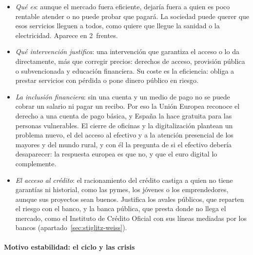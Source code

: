\documentclass[11pt]{article}
\begin{document}
\begin{itemize}
\item \emph{Qué es}: aunque el mercado fuera eficiente, dejaría fuera a quien es poco rentable atender o no puede probar que pagará. La sociedad puede querer que esos servicios lleguen a todos, como quiere que llegue la sanidad o la electricidad. Aparece en 2~frentes.
\item \emph{Qué intervención justifica}: una intervención que garantiza el acceso o lo da directamente, más que corregir precios: derechos de acceso, provisión pública o subvencionada y educación financiera. Su coste es la eficiencia: obliga a prestar servicios con pérdida o pone dinero público en riesgo.
\item \emph{La inclusión financiera}: sin una cuenta y un medio de pago no se puede cobrar un salario ni pagar un recibo. Por eso la Unión Europea reconoce el derecho a una cuenta de pago básica, y España la hace gratuita para las personas vulnerables. El cierre de oficinas y la digitalización plantean un problema nuevo, el del acceso al efectivo y a la atención presencial de los mayores y del mundo rural, y con él la pregunta de si el efectivo debería desaparecer: la respuesta europea es que no, y que el euro digital lo complemente\nocite{CE2023EuroDigital}.
\item \emph{El acceso al crédito}: el racionamiento del crédito castiga a quien no tiene garantías ni historial, como las pymes, los jóvenes o los emprendedores, aunque sus proyectos sean buenos. Justifica los avales públicos, que reparten el riesgo con el banco, y la banca pública, que presta donde no llega el mercado, como el Instituto de Crédito Oficial con sus líneas mediadas por los bancos (apartado~\ref{sec:stiglitz-weiss}).
\end{itemize}

\paragraph{Motivo estabilidad: el ciclo y las crisis}
\end{document}
